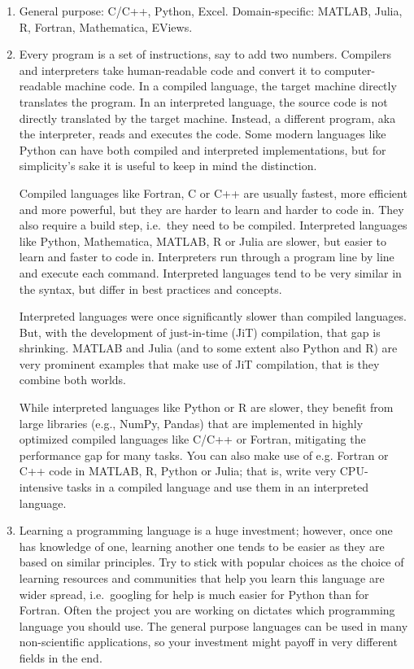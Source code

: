 \begin{enumerate}

\item
General purpose: C/C++, Python, Excel.
Domain-specific: MATLAB, Julia, R, Fortran, Mathematica, EViews.

\item
Every program is a set of instructions, say to add two numbers.
Compilers and interpreters take human-readable code and convert it to computer-readable machine code.
In a compiled language, the target machine directly translates the program.
In an interpreted language, the source code is not directly translated by the target machine.
Instead, a different program, aka the interpreter, reads and executes the code.
Some modern languages like Python can have both compiled and interpreted implementations,
  but for simplicity's sake it is useful to keep in mind the distinction.

Compiled languages like Fortran, C or C++ are usually fastest, more efficient and more powerful,
  but they are harder to learn and harder to code in.
They also require a build step, i.e.\ they need to be compiled.
Interpreted languages like Python, Mathematica, MATLAB, R or Julia are slower,
  but easier to learn and faster to code in.
Interpreters run through a program line by line and execute each command.
Interpreted languages tend to be very similar in the syntax,
  but differ in best practices and concepts.

Interpreted languages were once significantly slower than compiled languages.
But, with the development of just-in-time (JiT) compilation, that gap is shrinking.
MATLAB and Julia (and to some extent also Python and R) are very prominent examples that make use of JiT compilation,
  that is they combine both worlds.

While interpreted languages like Python or R are slower, they benefit from large libraries (e.g., NumPy, Pandas)
  that are implemented in highly optimized compiled languages like C/C++ or Fortran, mitigating the performance gap for many tasks.
You can also make use of e.g. Fortran or C++ code in MATLAB, R, Python or Julia;
  that is, write very CPU-intensive tasks in a compiled language
  and use them in an interpreted language.


\item
Learning a programming language is a huge investment;
  however, once one has knowledge of one, learning another one tends to be easier
  as they are based on similar principles.
Try to stick with popular choices as the choice of learning resources and communities
  that help you learn this language are wider spread,
  i.e.\ googling for help is much easier for Python than for Fortran.
Often the project you are working on dictates which programming language you should use.
The general purpose languages can be used in many non-scientific applications,
  so your investment might payoff in very different fields in the end.


\end{enumerate}
